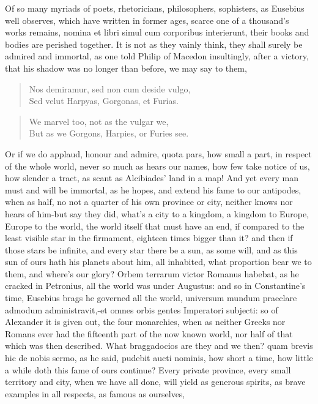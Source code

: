 {Of so many myriads of poets, rhetoricians, philosophers, sophisters, as
Eusebius well observes, which have written in former ages, scarce
one of a thousand's works remains, nomina et libri simul cum corporibus
interierunt, their books and bodies are perished together. It is not as
they vainly think, they shall surely be admired and immortal, as one
told Philip of Macedon insultingly, after a victory, that his shadow
was no longer than before, we may say to them,
%
\begin{verse}
\textlatin{Nos demiramur, sed non cum deside vulgo,}\\
\textlatin{Sed velut Harpyas, Gorgonas, et Furias.}
\end{verse}
\translationrule
\begin{verse}
We marvel too, not as the vulgar we,\\
But as we Gorgons, Harpies, or Furies see.
\end{verse}
%
Or if we do applaud, honour and admire, quota pars, how small a part,
in respect of the whole world, never so much as hears our names, how
few take notice of us, how slender a tract, as scant as Alcibiades'
land in a map! And yet every man must and will be immortal, as he
hopes, and extend his fame to our antipodes, when as half, no not a
quarter of his own province or city, neither knows nor hears of him-but
say they did, what's a city to a kingdom, a kingdom to Europe, Europe
to the world, the world itself that must have an end, if compared to
the least visible star in the firmament, eighteen times bigger than it?
and then if those stars be infinite, and every star there be a sun, as
some will, and as this sun of ours hath his planets about him, all
inhabited, what proportion bear we to them, and where's our glory?
Orbem terrarum victor Romanus habebat, as he cracked in Petronius, all
the world was under Augustus: and so in Constantine's time, Eusebius
brags he governed all the world, universum mundum praeclare admodum
administravit,-et omnes orbis gentes Imperatori subjecti: so of
Alexander it is given out, the four monarchies, \etc{} when as neither
Greeks nor Romans ever had the fifteenth part of the now known world,
nor half of that which was then described. What braggadocios are they
and we then? quam brevis hic de nobis sermo, as he said,
pudebit aucti nominis, how short a time, how little a while doth
this fame of ours continue? Every private province, every small
territory and city, when we have all done, will yield as generous
spirits, as brave examples in all respects, as famous as ourselves,
}
